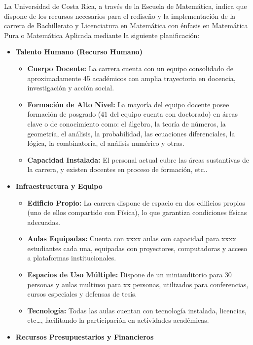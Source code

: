 \documentclass[11pt,a4paper]{article}
\begin{document}
La Universidad de Costa Rica, a través de la Escuela de Matemática, indica que dispone de los recursos necesarios para el rediseño y la implementación de la carrera de Bachillerato y Licenciatura en Matemática con énfasis en Matemática Pura o Matemática Aplicada mediante la siguiente planificación:
\begin{itemize}
    \item {\color{Azul-UCR}\textbf{Talento Humano (Recurso Humano)}}
    \begin{itemize}
        \item \textbf{Cuerpo Docente:} La carrera cuenta con un equipo consolidado de aproximadamente 45 académicos con amplia trayectoria en docencia, investigación y acción social.
        \item \textbf{Formación de Alto Nivel:} La mayoría del equipo docente posee formación de posgrado (41 del equipo cuenta con doctorado) en áreas clave o de conocimiento como: el álgebra, la teoría de números, la geometría, el análisis, la probabilidad, las ecuaciones diferenciales, la lógica, la combinatoria, el análisis numérico y otras.
        \item \textbf{Capacidad Instalada:} El personal actual cubre las áreas sustantivas de la carrera, y existen docentes en proceso de formación, etc..
    \end{itemize}
    \item {\color{Azul-UCR}\textbf{Infraestructura y Equipo}}
    \begin{itemize}
        \item \textbf{Edificio Propio:} La carrera dispone de espacio en dos edificios propios (uno de ellos compartido con Física), lo que garantiza condiciones físicas adecuadas.
        \item \textbf{Aulas Equipadas:} Cuenta con xxxx aulas con capacidad para xxxx estudiantes cada una, equipadas con proyectores, computadoras y acceso a plataformas institucionales.
        \item \textbf{Espacios de Uso Múltiple:} Dispone de un miniauditorio para 30 personas y aulas multiuso para xx personas, utilizados para conferencias, cursos especiales y defensas de tesis.
        \item \textbf{Tecnología:} Todas las aulas cuentan con tecnología instalada, licencias, etc…, facilitando la participación en actividades académicas.
    \end{itemize}
    \item {\color{Azul-UCR}\textbf{Recursos Presupuestarios y Financieros}}

\end{itemize}
\end{document}
